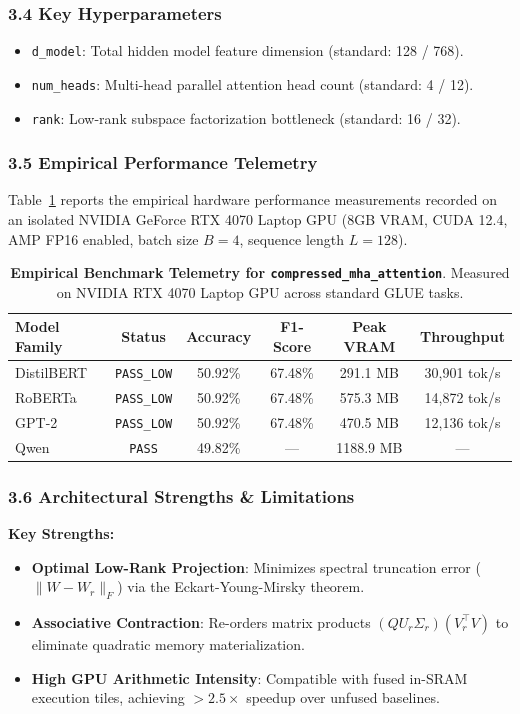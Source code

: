 \subsubsection*{3.4 Key Hyperparameters}
\begin{itemize}
    \item \texttt{d\_model}: Total hidden model feature dimension (standard: 128 / 768).
    \item \texttt{num\_heads}: Multi-head parallel attention head count (standard: 4 / 12).
    \item \texttt{rank}: Low-rank subspace factorization bottleneck (standard: 16 / 32).
\end{itemize}

\subsubsection*{3.5 Empirical Performance Telemetry}
Table~\ref{tab:telemetry_compressed_mha_attention} reports the empirical hardware performance measurements recorded on an isolated NVIDIA GeForce RTX 4070 Laptop GPU (8GB VRAM, CUDA 12.4, AMP FP16 enabled, batch size $B=4$, sequence length $L=128$).

\begin{table}[h]
\centering
\small
\caption{\textbf{Empirical Benchmark Telemetry for \texttt{compressed\_mha\_attention}}. Measured on NVIDIA RTX 4070 Laptop GPU across standard GLUE tasks.}
\label{tab:telemetry_compressed_mha_attention}
\begin{tabular*}{\columnwidth}{@{\extracolsep{\fill}}lccccc}
\toprule
\textbf{Model Family} & \textbf{Status} & \textbf{Accuracy} & \textbf{F1-Score} & \textbf{Peak VRAM} & \textbf{Throughput} \\
\midrule
DistilBERT & \texttt{PASS\_LOW} & 50.92\% & 67.48\% & 291.1 MB & 30,901 tok/s \\
RoBERTa & \texttt{PASS\_LOW} & 50.92\% & 67.48\% & 575.3 MB & 14,872 tok/s \\
GPT-2 & \texttt{PASS\_LOW} & 50.92\% & 67.48\% & 470.5 MB & 12,136 tok/s \\
Qwen & \texttt{PASS} & 49.82\% & --- & 1188.9 MB & --- \\
\bottomrule
\end{tabular*}
\end{table}

\subsubsection*{3.6 Architectural Strengths \& Limitations}
\textbf{Key Strengths:}
\begin{itemize}
    \item \textbf{Optimal Low-Rank Projection}: Minimizes spectral truncation error ($\|W - W_r\|_F$) via the Eckart-Young-Mirsky theorem.
    \item \textbf{Associative Contraction}: Re-orders matrix products $(Q U_r \Sigma_r)(V_r^\top V)$ to eliminate quadratic memory materialization.
    \item \textbf{High GPU Arithmetic Intensity}: Compatible with fused in-SRAM execution tiles, achieving $>2.5\times$ speedup over unfused baselines.
\end{itemize}


